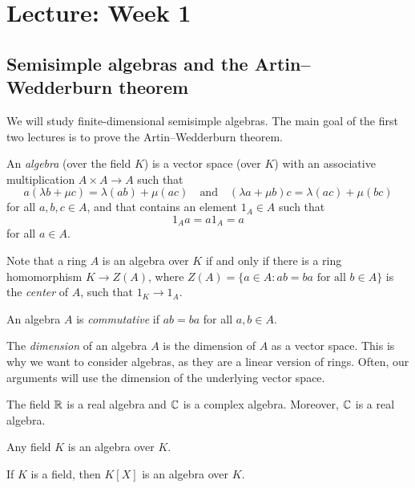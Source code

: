 \section{Lecture: Week 1}

\subsection{Semisimple algebras and the Artin--Wedderburn theorem}

We will study  
finite-dimensional semisimple algebras. The main goal of the first two lectures is to
prove the Artin--Wedderburn theorem. 

\begin{definition}
	An \emph{algebra} (over the field $K$) is a vector space (over $K$) 
	with an associative multiplication $A\times A\to A$ such that
	\[
    a(\lambda b+\mu c)=\lambda(ab)+\mu(ac)\quad\text{and}\quad 
	(\lambda a+\mu b)c=\lambda(ac)+\mu (bc)
 \]
    for all $a,b,c\in A$, and 
	that contains an element $1_A\in A$ such that 
 \[
 1_Aa=a1_A=a
 \]
 for all $a\in A$.
 \end{definition}

Note that a ring $A$ is an algebra over $K$ 
if and only if 
there is a ring homomorphism $K\to Z(A)$, where $Z(A)=\{a\in A:ab=ba\text{ for all $b\in A$}\}$ is the \emph{center} of $A$, 
such that $1_K\to 1_A$. 

\begin{definition}
	An algebra $A$ is \emph{commutative} if $ab=ba$ for all $a,b\in A$. 
\end{definition}

The \emph{dimension} of an algebra $A$ is the dimension of $A$ as a vector space. This is why we want to consider algebras, as 
they are a linear version of rings. Often, our arguments will use the dimension of the underlying vector space.  

\begin{example}
	The field $\mathbb{R}$ is a real algebra and  
	$\mathbb{C}$ is a complex algebra. Moreover, $\mathbb{C}$ is a real algebra. 
\end{example}

Any field $K$ is an algebra over $K$.

\begin{example}
	If $K$ is a field, then $K[X]$ is an algebra over $K$. 
\end{example}


